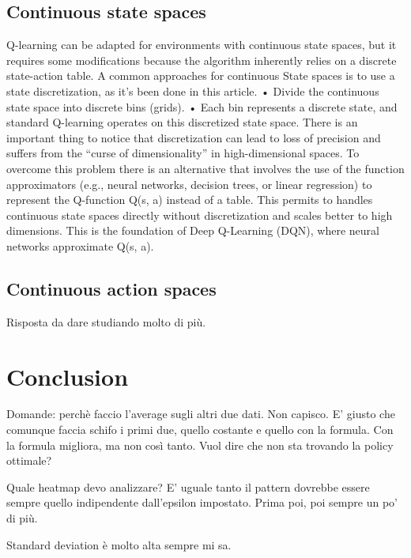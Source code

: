\documentclass{article}
\begin{document}
\subsection{Continuous state spaces}
Q-learning can be adapted for environments with continuous state spaces, but it requires some modifications because the algorithm inherently relies on a discrete state-action table. A common approaches for continuous State spaces
is to use a state discretization, as it's been done in this article.
•	Divide the continuous state space into discrete bins (grids).
•	Each bin represents a discrete state, and standard Q-learning operates on this discretized state space.
There is an important thing to notice that discretization can lead to loss of precision and suffers from the “curse of dimensionality”\cite{article} in high-dimensional spaces.
To overcome this problem there is an alternative that involves the use of the function approximators (e.g., neural networks, decision trees, or linear regression) to represent the Q-function Q(s, a) instead of a table. This permits to handles continuous state spaces directly without discretization and scales better to high dimensions. This is the foundation of Deep Q-Learning (DQN), where neural networks approximate Q(s, a).

\subsection{Continuous action spaces}
Risposta da dare studiando molto di più.



\section{Conclusion}

Domande: 
perchè faccio l'average sugli altri due dati. Non capisco.
E' giusto che comunque faccia schifo i primi due, quello costante e quello con la formula. Con la formula migliora, ma non così tanto. Vuol dire che non sta trovando la policy ottimale?

Quale heatmap devo analizzare? E' uguale tanto il pattern dovrebbe essere sempre quello indipendente dall'epsilon impostato. Prima poi, poi sempre un po' di più.

Standard deviation è molto alta sempre mi sa.

\label{sec:conclusion}


\end{document}
